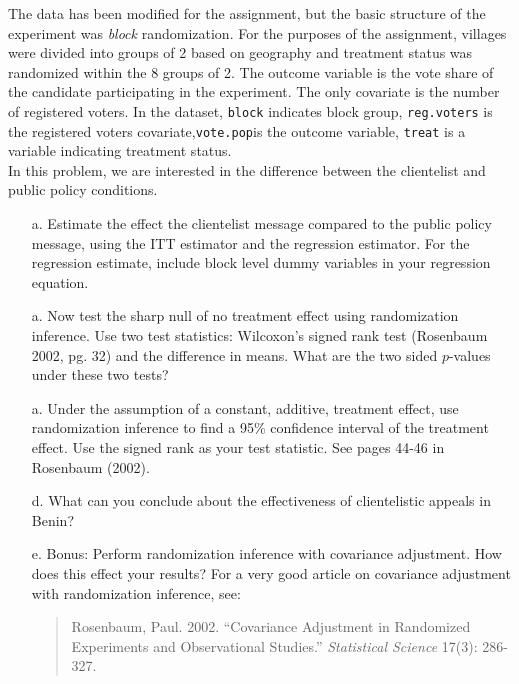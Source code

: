 \documentclass{article}
\begin{document}
The data has been modified for the assignment, but the basic structure
of the experiment was \textit{block} randomization. For the purposes
of the assignment, villages were divided into groups of 2 based on
geography and treatment status was randomized within the 8 groups of
2. The outcome variable is the vote share of the candidate
participating in the experiment. The only covariate is the number of
registered voters. In the dataset, \texttt{block} indicates block
group, \texttt{reg.voters} is the registered voters
covariate,\texttt{vote.pop}is the outcome variable, \texttt{treat} is
a variable indicating treatment status.\\

\noindent In this problem, we are interested in the difference between
the clientelist and public policy conditions.  
\begin{itemize}
\item[a.] Estimate the effect the clientelist message compared to the
  public policy message, using the ITT estimator and the regression
  estimator. For the regression estimate, include block level dummy
  variables in your regression equation.  
\item[a.] Now test the sharp null
  of no treatment effect using randomization inference. Use two test
  statistics: Wilcoxon’s signed rank test (Rosenbaum 2002, pg. 32) and
  the difference in means. What are the two sided $p$-values under these
  two tests?  
\item[a.] Under the assumption of a constant, additive, treatment
  effect, use randomization inference to find a 95\% confidence
  interval of the treatment effect. Use the signed rank as your test
  statistic. See pages 44-46 in Rosenbaum (2002).
\item[d.] What can you conclude about the effectiveness of clientelistic
  appeals in Benin?
\item[e.] Bonus: Perform randomization inference with covariance adjustment. How does this effect your results? For a very good article on  covariance adjustment with randomization inference, see: 
\begin{quote}
Rosenbaum, Paul. 2002. “Covariance Adjustment in Randomized Experiments and Observational Studies.” \textit{Statistical Science} 17(3): 286-327. 
\end{quote}
\end{itemize}
\end{document}
